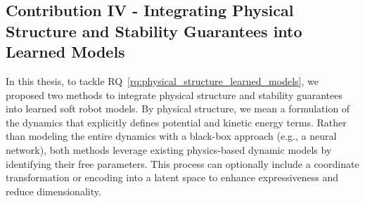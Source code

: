 \subsection{Contribution IV - Integrating Physical Structure and Stability Guarantees into Learned Models}
In this thesis, to tackle \gls{RQ}~\ref{rq:physical_structure_learned_models}, we proposed two methods to integrate physical structure and stability guarantees into learned soft robot models. By physical structure, we mean a formulation of the dynamics that explicitly defines potential and kinetic energy terms. Rather than modeling the entire dynamics with a black-box approach (e.g., a neural network), both methods leverage existing physics-based dynamic models by identifying their free parameters. This process can optionally include a coordinate transformation or encoding into a latent space to enhance expressiveness and reduce dimensionality.

